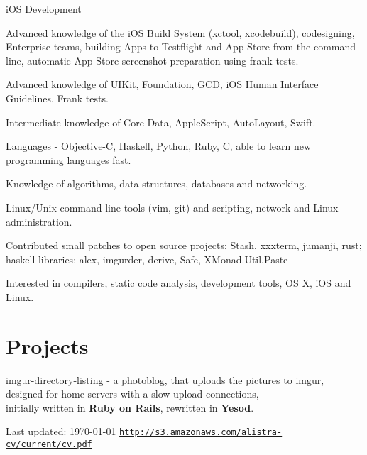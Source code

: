 \documentclass[letterpaper]{article}
\renewenvironment{itemize}{
  \begin{list}{}{
    \setlength{\leftmargin}{1.5em}
  }
}{
  \end{list}
}
\begin{document}
\begin{itemize}
	\item iOS Development \begin{itemize}
		\item Advanced knowledge of the iOS Build System (xctool, xcodebuild), codesigning, Enterprise teams, building Apps to Testflight and App Store from the command line, automatic App Store screenshot preparation using frank tests.
		\item Advanced knowledge of UIKit, Foundation, GCD, iOS Human Interface Guidelines, Frank tests.
		\item Intermediate knowledge of Core Data, AppleScript, AutoLayout, Swift.
	\end{itemize}	

	\item Languages - Objective-C, Haskell, Python, Ruby, C, able to learn new programming languages fast.
	\item Knowledge of algorithms, data structures, databases and networking.
    \item Linux/Unix command line tools (vim, git) and scripting, network and Linux administration.
	\item Contributed small patches to open source projects: Stash, xxxterm, jumanji, rust;\\
		 haskell libraries: alex, imgurder, derive, Safe, XMonad.Util.Paste
	\item Interested in compilers, static code analysis, development tools, OS X, iOS and Linux.
\end{itemize}

\section*{Projects}
\begin{itemize}
    \item imgur-directory-listing - a photoblog, that uploads the pictures to \href{http://imgur.com}{imgur},
        designed for home servers with a slow upload connections,\\ initially written in {\bf Ruby on Rails}, rewritten in {\bf Yesod}.
\end{itemize}

\bigskip

\begin{center}
  \begin{footnotesize}
    Last updated: \today
    \hfill
    \href{http://s3.amazonaws.com/alistra-cv/current/cv.pdf}
    {\texttt{http://s3.amazonaws.com/alistra-cv/current/cv.pdf}}
  \end{footnotesize}
\end{center}
\end{document}

